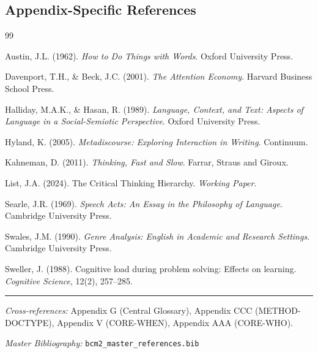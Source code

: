 \subsection{Appendix-Specific References}

\begin{thebibliography}{99}

 Austin, J.L. (1962).
\textit{How to Do Things with Words}.
Oxford University Press.

 Davenport, T.H., \& Beck, J.C. (2001).
\textit{The Attention Economy}.
Harvard Business School Press.

 Halliday, M.A.K., \& Hasan, R. (1989).
\textit{Language, Context, and Text: Aspects of Language in a Social-Semiotic Perspective}.
Oxford University Press.

 Hyland, K. (2005).
\textit{Metadiscourse: Exploring Interaction in Writing}.
Continuum.

 Kahneman, D. (2011).
\textit{Thinking, Fast and Slow}.
Farrar, Straus and Giroux.

 List, J.A. (2024).
The Critical Thinking Hierarchy.
\textit{Working Paper}.

 Searle, J.R. (1969).
\textit{Speech Acts: An Essay in the Philosophy of Language}.
Cambridge University Press.

 Swales, J.M. (1990).
\textit{Genre Analysis: English in Academic and Research Settings}.
Cambridge University Press.

 Sweller, J. (1988).
Cognitive load during problem solving: Effects on learning.
\textit{Cognitive Science}, 12(2), 257--285.

\end{thebibliography}



\vspace{1em}
\hrule
\vspace{0.5em}

\noindent\textit{Cross-references:}
Appendix G (Central Glossary),
Appendix CCC (METHOD-DOCTYPE),
Appendix V (CORE-WHEN),
Appendix AAA (CORE-WHO).

\noindent\textit{Master Bibliography:} \texttt{bcm2\_master\_references.bib}


